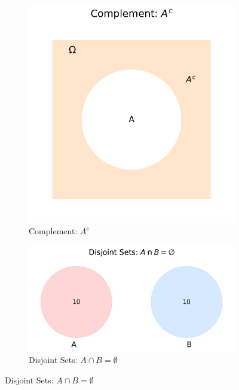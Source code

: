 \begin{figure}[h]
    \vspace{0.5cm}
    
    \begin{subfigure}{0.48\textwidth}
        \includegraphics[width=\textwidth]{figures/set_operations/complement.png}
        \caption{Complement: $A^c$}
        \label{fig:complement}
    \end{subfigure}
    \hfill
    \begin{subfigure}{0.48\textwidth}
        \includegraphics[width=\textwidth]{figures/set_operations/disjoint.png}
        \caption{Disjoint Sets: $A \cap B = \emptyset$}
        \label{fig:disjoint}
    \end{subfigure}
    

\end{figure}
